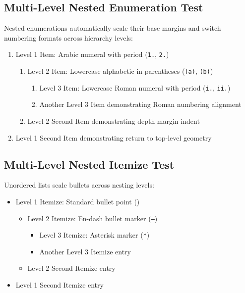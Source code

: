 \documentclass[11pt, a4paper]{article}
\begin{document}
\subsection{Multi-Level Nested Enumeration Test}
Nested enumerations automatically scale their base margins and switch numbering formats across hierarchy levels:

\begin{enumerate}
\item Level 1 Item: Arabic numeral with period (\texttt{1.}, \texttt{2.})
  \begin{enumerate}
  \item Level 2 Item: Lowercase alphabetic in parentheses (\texttt{(a)}, \texttt{(b)})
    \begin{enumerate}
    \item Level 3 Item: Lowercase Roman numeral with period (\texttt{i.}, \texttt{ii.})
    \item Another Level 3 Item demonstrating Roman numbering alignment
    \end{enumerate}
  \item Level 2 Second Item demonstrating depth margin indent
  \end{enumerate}
\item Level 1 Second Item demonstrating return to top-level geometry
\end{enumerate}

\subsection{Multi-Level Nested Itemize Test}
Unordered lists scale bullets across nesting levels:

\begin{itemize}
\item Level 1 Itemize: Standard bullet point (\texttt{\textbullet})
  \begin{itemize}
  \item Level 2 Itemize: En-dash bullet marker (\texttt{--})
    \begin{itemize}
    \item Level 3 Itemize: Asterisk marker (\texttt{*})
    \item Another Level 3 Itemize entry
    \end{itemize}
  \item Level 2 Second Itemize entry
  \end{itemize}
\item Level 1 Second Itemize entry
\end{itemize}
\end{document}
